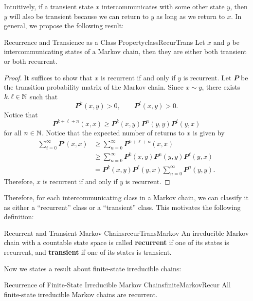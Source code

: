 \documentclass[math, code]{amznotes}
\theoremstyle{remark}
\begin{document}
Intuitively, if a transient state $x$ intercommunicates with some other state $y$, then $y$ will also be transient because we can return to $y$ as long as we return to $x$. In general, we propose the following result:
\begin{probox}{Recurrence and Transience as a Class Property}{classRecurTrans}
    Let $x$ and $y$ be intercommunicating states of a Markov chain, then they are either both transient or both recurrent.
    \tcblower
    \begin{proof}
        It suffices to show that $x$ is recurrent if and only if $y$ is recurrent. Let $\mathbfit{P}$ be the transition probability matrix of the Markov chain. Since $x \sim y$, there exists $k, \ell \in \mathbb{N}$ such that
        \begin{equation*}
            \mathbfit{P}^k\left(x, y\right) > 0, \qquad \mathbfit{P}^{\ell}\left(x, y\right) > 0.
        \end{equation*}
        Notice that 
        \begin{equation*}
            \mathbfit{P}^{k + \ell + n}\left(x, x\right) \geq \mathbfit{P}^{k}\left(x, y\right)\mathbfit{P}^{n}\left(y, y\right)\mathbfit{P}^{\ell}\left(y, x\right)
        \end{equation*}
        for all $n \in \mathbb{N}$. Notice that the expected number of returns to $x$ is given by 
        \begin{align*}
            \sum_{i = 0}^{\infty}\mathbfit{P}^i\left(x, x\right) & \geq \sum_{n = 0}^{\infty}\mathbfit{P}^{k + \ell + n}\left(x, x\right) \\
            & \geq \sum_{n = 0}^{\infty}\mathbfit{P}^{k}\left(x, y\right)\mathbfit{P}^{n}\left(y, y\right)\mathbfit{P}^{\ell}\left(y, x\right) \\
            & = \mathbfit{P}^{k}\left(x, y\right)\mathbfit{P}^{\ell}\left(y, x\right)\sum_{n = 0}^{\infty}\mathbfit{P}^{n}\left(y, y\right).
        \end{align*}
        Therefore, $x$ is recurrent if and only if $y$ is recurrent.
    \end{proof}
\end{probox}
Therefore, for each intercommunicating class in a Markov chain, we can classify it as either a ``recurrent'' class or a ``transient'' class. This motivates the following definition:
\begin{dfnbox}{Recurrent and Transient Markov Chains}{recurTransMarkov}
    An irreducible Markov chain with a countable state space is called {\color{red} \textbf{recurrent}} if one of its states is recurrent, and {\color{red} \textbf{transient}} if one of its states is transient.
\end{dfnbox}
Now we states a result about finite-state irreducible chains:
\begin{probox}{Recurrence of Finite-State Irreducible Markov Chains}{finiteMarkovRecur}
    All finite-state irreducible Markov chains are recurrent.
\end{probox}
\end{document}
